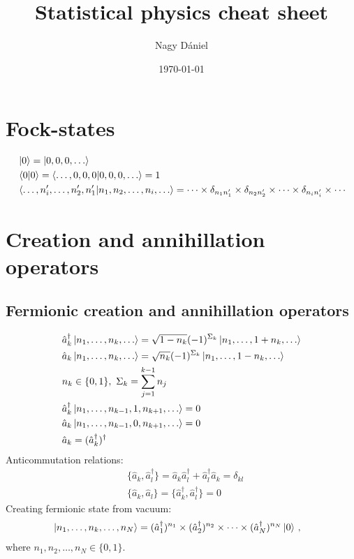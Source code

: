 \documentclass[11pt, a4paper]{article}
\title{Statistical physics cheat sheet}
\author{Nagy Dániel}
\date{\today}
\begin{document}
\maketitle
\newpage

\section{Fock-states}
\begin{align*}
    &\ket 0 = \ket{0,0,0,\dots} \\
    &\braket{0|0} = \braket{\dots,0,0,0|0,0,0,\dots} = 1\\
    &\braket{\dots, n_i', \dots, n_2', n_1' | n_1, n_2, \dots, n_i, \dots}
    = \cdots\times\delta_{n_1n_1'}\times\delta_{n_2n_2'}\times\cdots\times\delta_{n_in_i'}\times\cdots
\end{align*}

\section{Creation and annihillation operators}
\subsection{Fermionic creation and annihillation operators}
\begin{align*}
    &\hat a_k^{\dagger} \ket{n_1, \dots, n_k, \dots} = \sqrt{1-n_k} (-1)^{\Sigma_k} \ket{n_1, \dots, 1 + n_k, \dots} \\
    &\hat a_k \ket{n_1, \dots, n_k, \dots} = \sqrt{n_k} (-1)^{\Sigma_k} \ket{n_1, \dots, 1 - n_k, \dots}\\
    &n_k \in \{0,1\},~ \Sigma_k = \sum\limits_{j=1}^{k-1}n_j \\
    &\hat a_k^{\dagger} \ket{n_1, \dots, n_{k-1}, 1, n_{k+1},\dots} = 0 \\
    &\hat a_k \ket{n_1, \dots, n_{k-1}, 0, n_{k+1},\dots} = 0\\
    &\hat a_k = (\hat a_k^{\dagger})^{\dagger}
\end{align*}
Anticommutation relations:
\begin{align*}
    &\{\hat a_k, \hat a_l^{\dagger}\}  = \hat a_k\hat a_l^{\dagger}+\hat a_l^{\dagger}\hat a_k = \delta_{kl}\\
    &\{\hat a_k, \hat a_l\} = \{ \hat a_k^{\dagger}, \hat a_l^{\dagger} \} = 0
\end{align*}
Creating fermionic state from vacuum:
\begin{align*}
    &\ket{n_1, \dots, n_k, \dots, n_N} = (\hat a_1^{\dagger})^{n_1} \times (\hat a_2^{\dagger})^{n_2}
    \times \dots \times (\hat a_N^{\dagger})^{n_N} \ket{0}\,,
\end{align*}
where $n_1, n_2, \dots ,n_N \in \{0,1\}$.
\end{document}
